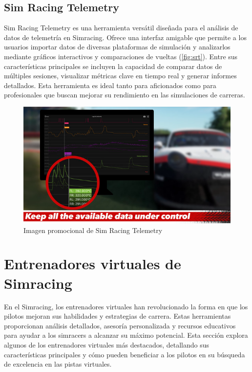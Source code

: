 \subsection{Sim Racing Telemetry}
Sim Racing Telemetry \cite{srt} es una herramienta versátil diseñada para el análisis de datos de telemetría en Simracing. Ofrece una interfaz amigable que permite a los usuarios importar datos de diversas plataformas de simulación y analizarlos mediante gráficos interactivos y comparaciones de vueltas (\autoref{fig:srt}). Entre sus características principales se incluyen la capacidad de comparar datos de múltiples sesiones, visualizar métricas clave en tiempo real y generar informes detallados. Esta herramienta es ideal tanto para aficionados como para profesionales que buscan mejorar su rendimiento en las simulaciones de carreras.
\begin{figure}[H]
	\centering
	\includegraphics[width=0.6\linewidth]{./figs/herramientas/analisis/simracingtelemetry.png}
	\caption[Imagen promocional de Sim Racing Telemetry]{Imagen promocional de Sim Racing Telemetry \cite{srt_cap}}
    \label{fig:srt}
\end{figure}

\section{Entrenadores virtuales de Simracing}
En el Simracing, los entrenadores virtuales han revolucionado la forma en que los pilotos mejoran sus habilidades y estrategias de carrera. Estas herramientas proporcionan análisis detallados, asesoría personalizada y recursos educativos para ayudar a los simracers a alcanzar su máximo potencial. Esta sección explora algunos de los entrenadores virtuales más destacados, detallando sus características principales y cómo pueden beneficiar a los pilotos en su búsqueda de excelencia en las pistas virtuales.

